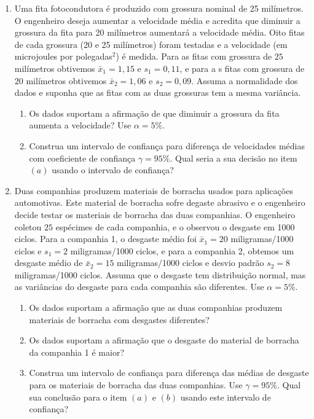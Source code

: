\documentclass[8pt, a4paper]{article}
\begin{document}
\begin{enumerate}
	\item Uma fita fotocondutora é produzido com grossura nominal de 25 milímetros. O engenheiro deseja aumentar a velocidade média e acredita que diminuir a grossura da fita para 20 milímetros aumentará a velocidade média. Oito fitas de cada grossura (20 e 25 milímetros) foram testadas e a velocidade (em microjoules por polegadas$^2$) é medida. Para as fitas com grossura de $25$ milímetros obtivemos $\bar{x}_1=1,15$ e $s_1 = 0,11$, e para a s fitas com grossura de $20$ milímetros obtivemos $\bar{x}_2=1,06$ e $s_2=0,09$. Assuma a normalidade dos dados e suponha que as fitas com as duas grossuras tem a mesma variância.
	\begin{enumerate}
		\item Os dados suportam a afirmação de que diminuir a grossura da fita aumenta a velocidade? Use $\alpha = 5\%$.
		\item Construa um intervalo de confiança para diferença de velocidades médias com coeficiente de confiança $\gamma=95\%$. Qual seria a sua decisão no item $(a)$ usando o intervalo de confiança?
	\end{enumerate}

	\item Duas companhias produzem materiais de borracha usados para aplicações automotivas. Este material de borracha sofre degaste abrasivo e o engenheiro decide testar os materiais de borracha das duas companhias. O engenheiro coletou $25$ espécimes de cada companhia, e o observou o desgaste em 1000 ciclos. Para a companhia 1, o desgaste médio foi $\bar{x}_1=20$ miligramas/1000 ciclos e $s_1=2$ miligramas/1000 ciclos, e para a companhia 2, obtemos um desgaste médio de $\bar{x}_2=15$ miligramas/1000 ciclos e desvio padrão $s_2 = 8$ miligramas/1000 ciclos. Assuma que o desgaste tem distribuição normal, mas as variâncias do desgaste para cada companhia são diferentes. Use $\alpha=5\%$.
	\begin{enumerate}
		\item Os dados suportam a afirmação que as duas companhias produzem materiais de borracha com desgastes diferentes?
		\item Os dados suportam a afirmação que o desgaste do material de borracha da companhia 1 é maior?
		\item Construa um intervalo de confiança para diferença das médias de desgaste para os materiais de borracha das duas companhias. Use $\gamma=95\%$. Qual sua conclusão para o item $(a)$ e $(b)$ usando este intervalo de confiança?
	\end{enumerate}


\end{enumerate}
\end{document}
